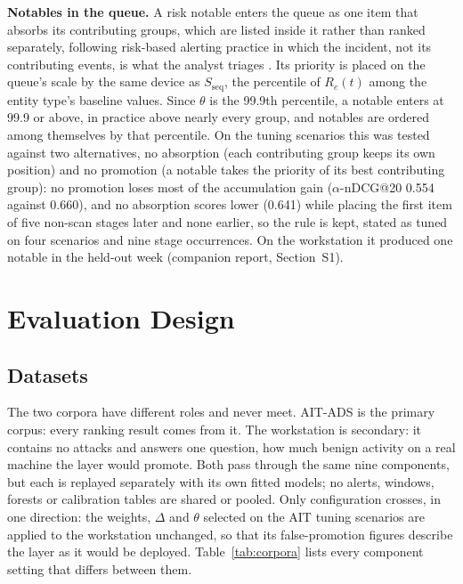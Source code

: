 \documentclass[conference]{IEEEtran}
\begin{document}
\textbf{Notables in the queue.} A risk notable enters the queue as one item that absorbs its contributing groups, which are listed inside it rather than ranked separately, following risk-based alerting practice in which the incident, not its contributing events, is what the analyst triages \cite{ref19}. Its priority is placed on the queue's scale by the same device as $S_\mathrm{seq}$, the percentile of $R_e(t)$ among the entity type's baseline values. Since $\theta$ is the 99.9th percentile, a notable enters at 99.9 or above, in practice above nearly every group, and notables are ordered among themselves by that percentile. On the tuning scenarios this was tested against two alternatives, no absorption (each contributing group keeps its own position) and no promotion (a notable takes the priority of its best contributing group): no promotion loses most of the accumulation gain ($\alpha$-nDCG@20 0.554 against 0.660), and no absorption scores lower (0.641) while placing the first item of five non-scan stages later and none earlier, so the rule is kept, stated as tuned on four scenarios and nine stage occurrences. On the workstation it produced one notable in the held-out week (companion report, Section~S1).

\section{Evaluation Design}
\label{sec:eval}

\subsection{Datasets}

The two corpora have different roles and never meet. AIT-ADS is the primary corpus: every ranking result comes from it. The workstation is secondary: it contains no attacks and answers one question, how much benign activity on a real machine the layer would promote. Both pass through the same nine components, but each is replayed separately with its own fitted models; no alerts, windows, forests or calibration tables are shared or pooled. Only configuration crosses, in one direction: the weights, $\Delta$ and $\theta$ selected on the AIT tuning scenarios are applied to the workstation unchanged, so that its false-promotion figures describe the layer as it would be deployed. Table~\ref{tab:corpora} lists every component setting that differs between them.
\end{document}
